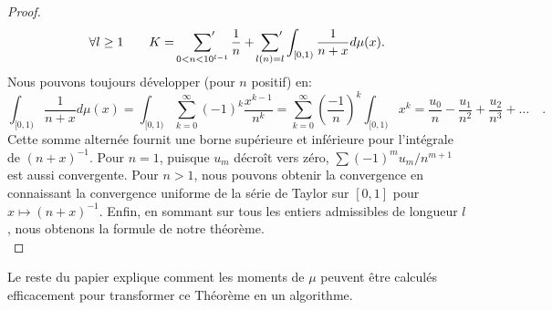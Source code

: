 \begin{proof}
	\begin{equation}
		\forall l\ge 1 \qquad K= \sideset{}{'}\sum_{0<n<10^{l-1}} \frac{1}{n} +
		\sideset{}{'}\sum_{l(n)=l} \int_{[0, 1)} \frac{1}{n+x} d\mu(x).
	\end{equation}
	Nous pouvons toujours d\'evelopper (pour $n$ positif) en:
	\[
		\int_{[0,1)} \frac{1}{n+x} d\mu(x) = \int_{[0, 1)} \sum_{k=0}^{\infty}
		(-1)^{k} \frac{x^{k-1}}{n^{k}} = \sum_{k=0}^{\infty} \left( \frac{-1}{n}
		\right)^{k} \int_{[0, 1)}x^{k} = \frac{u_{0}}{n} - \frac{u_{1}}{n^{2}} +
		\frac{u_{2}}{n^{3}}+\ldots \quad.
	\]
	Cette somme alternée fournit une borne supérieure et inférieure pour
	l'int\'egrale de $(n+x)^{-1}$. Pour $n=1$, puisque $u_{m}$ décroît vers zéro,
	$\sum (-1)^{m}u_{m}/n^{m+1}$ est aussi convergente. Pour $n>1$, nous
	pouvons obtenir la convergence en connaissant la convergence uniforme de la
	série de Taylor sur $[0,1]$ pour $x\mapsto (n+x)^{-1}$. Enfin, en sommant
	sur tous les entiers admissibles de longueur $l$, nous obtenons la formule
	de notre théorème.\\
\end{proof}

	Le reste du papier explique comment les moments de $\mu$ peuvent être
	calculés efficacement pour transformer ce Théorème en un algorithme.

